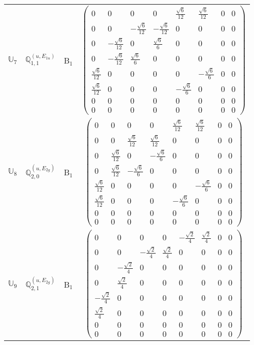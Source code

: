 \documentclass[fleqn,10pt,landscape]{article}
\begin{document}
\begin{itemize}
\begin{center}
\begin{longtable}{c|c|c|c}
$ \mathbb{U}_{7} $ & $\mathbb{Q}_{1,1}^{(u,E_{1u})}$ & B$_{1}$ & $\begin{pmatrix} 0 & 0 & 0 & 0 & \frac{\sqrt{6}}{12} & \frac{\sqrt{6}}{12} & 0 & 0 \\ 0 & 0 & - \frac{\sqrt{6}}{12} & - \frac{\sqrt{6}}{12} & 0 & 0 & 0 & 0 \\ 0 & - \frac{\sqrt{6}}{12} & 0 & \frac{\sqrt{6}}{6} & 0 & 0 & 0 & 0 \\ 0 & - \frac{\sqrt{6}}{12} & \frac{\sqrt{6}}{6} & 0 & 0 & 0 & 0 & 0 \\ \frac{\sqrt{6}}{12} & 0 & 0 & 0 & 0 & - \frac{\sqrt{6}}{6} & 0 & 0 \\ \frac{\sqrt{6}}{12} & 0 & 0 & 0 & - \frac{\sqrt{6}}{6} & 0 & 0 & 0 \\ 0 & 0 & 0 & 0 & 0 & 0 & 0 & 0 \\ 0 & 0 & 0 & 0 & 0 & 0 & 0 & 0 \end{pmatrix}$ \\
$ \mathbb{U}_{8} $ & $\mathbb{Q}_{2,0}^{(u,E_{2g})}$ & B$_{1}$ & $\begin{pmatrix} 0 & 0 & 0 & 0 & \frac{\sqrt{6}}{12} & \frac{\sqrt{6}}{12} & 0 & 0 \\ 0 & 0 & \frac{\sqrt{6}}{12} & \frac{\sqrt{6}}{12} & 0 & 0 & 0 & 0 \\ 0 & \frac{\sqrt{6}}{12} & 0 & - \frac{\sqrt{6}}{6} & 0 & 0 & 0 & 0 \\ 0 & \frac{\sqrt{6}}{12} & - \frac{\sqrt{6}}{6} & 0 & 0 & 0 & 0 & 0 \\ \frac{\sqrt{6}}{12} & 0 & 0 & 0 & 0 & - \frac{\sqrt{6}}{6} & 0 & 0 \\ \frac{\sqrt{6}}{12} & 0 & 0 & 0 & - \frac{\sqrt{6}}{6} & 0 & 0 & 0 \\ 0 & 0 & 0 & 0 & 0 & 0 & 0 & 0 \\ 0 & 0 & 0 & 0 & 0 & 0 & 0 & 0 \end{pmatrix}$ \\
$ \mathbb{U}_{9} $ & $\mathbb{Q}_{2,1}^{(u,E_{2g})}$ & B$_{1}$ & $\begin{pmatrix} 0 & 0 & 0 & 0 & - \frac{\sqrt{2}}{4} & \frac{\sqrt{2}}{4} & 0 & 0 \\ 0 & 0 & - \frac{\sqrt{2}}{4} & \frac{\sqrt{2}}{4} & 0 & 0 & 0 & 0 \\ 0 & - \frac{\sqrt{2}}{4} & 0 & 0 & 0 & 0 & 0 & 0 \\ 0 & \frac{\sqrt{2}}{4} & 0 & 0 & 0 & 0 & 0 & 0 \\ - \frac{\sqrt{2}}{4} & 0 & 0 & 0 & 0 & 0 & 0 & 0 \\ \frac{\sqrt{2}}{4} & 0 & 0 & 0 & 0 & 0 & 0 & 0 \\ 0 & 0 & 0 & 0 & 0 & 0 & 0 & 0 \\ 0 & 0 & 0 & 0 & 0 & 0 & 0 & 0 \end{pmatrix}$ \\

\end{longtable}
\end{center}
\end{itemize}
\end{document}
